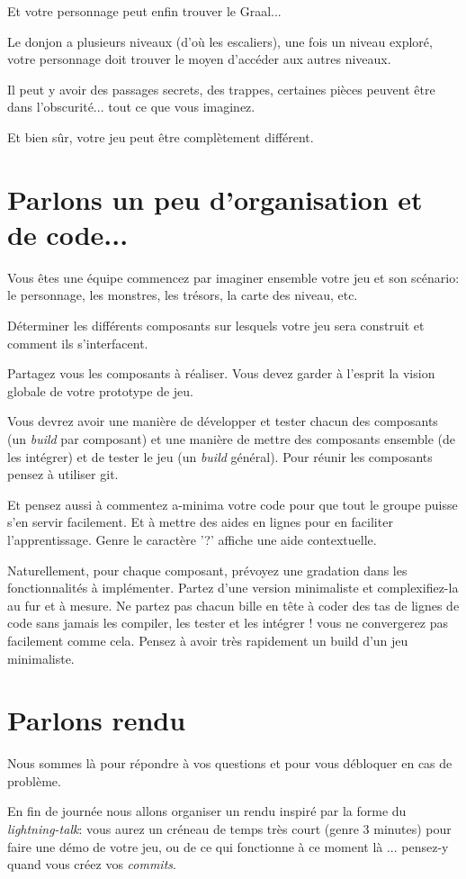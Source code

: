\documentclass{article}
\begin{document}
\vspace{.3cm}

Et votre personnage peut enfin trouver le Graal...

\vspace{.3cm}

Le donjon a plusieurs niveaux (d'où les escaliers), une fois un niveau
exploré, votre personnage doit trouver le moyen d'accéder aux autres
niveaux.

Il peut y avoir des passages secrets, des trappes, certaines pièces
peuvent être dans l'obscurité... tout ce que vous imaginez.

\vspace{.3cm}

Et bien sûr, votre jeu peut être complètement différent.

\section{Parlons un peu d'organisation et de code...}

Vous êtes une équipe commencez par imaginer ensemble votre jeu et son
scénario: le personnage, les monstres, les trésors, la carte des
niveau, etc.

Déterminer les différents composants sur lesquels votre jeu sera
construit et comment ils s'interfacent.

Partagez vous les composants à réaliser. Vous devez garder à l'esprit
la vision globale de votre prototype de jeu.

Vous devrez avoir une manière de développer et tester chacun des
composants (un \textsl{build} par composant) et une manière de mettre
des composants ensemble (de les intégrer) et de tester le jeu (un
\textsl{build} général). Pour réunir les composants pensez à utiliser
git.

Et pensez aussi à commentez a-minima votre code pour que tout le
groupe puisse s'en servir facilement. Et à mettre des aides en lignes
pour en faciliter l'apprentissage. Genre le caractère '?'  affiche une
aide contextuelle.

Naturellement, pour chaque composant, prévoyez une gradation dans les
fonctionnalités à implémenter. Partez d'une version minimaliste et
complexifiez-la au fur et à mesure. Ne partez pas chacun bille en tête
à coder des tas de lignes de code sans jamais les compiler, les tester
et les intégrer !  vous ne convergerez pas facilement comme
cela. Pensez à avoir très rapidement un build d'un jeu minimaliste.

\section{Parlons rendu}

Nous sommes là pour répondre à vos questions et pour vous débloquer en
cas de problème.

En fin de journée nous allons organiser un rendu inspiré par la forme
du \textit{lightning-talk}: vous aurez un créneau de temps très court
(genre 3 minutes) pour faire une démo de votre jeu, ou de ce qui
fonctionne à ce moment là ... pensez-y quand vous créez vos
\textit{commits}.
\end{document}
